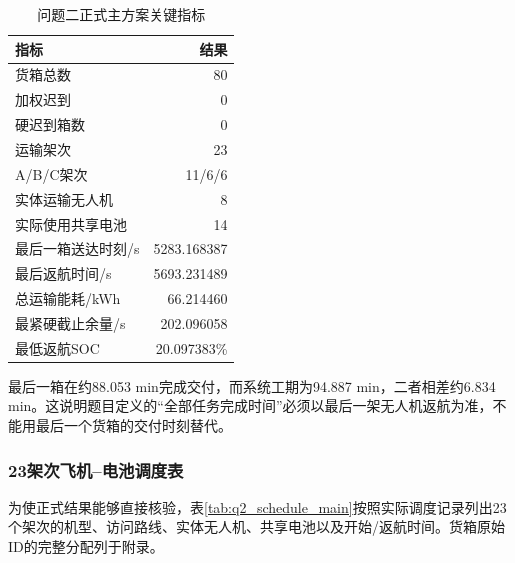 \documentclass[UTF8,a4paper,12pt]{ctexart}
\begin{document}
\begin{table}[H]
\centering
\caption{问题二正式主方案关键指标}
\label{tab:q2_main_metrics}
\begin{tabular}{lr}
\toprule
指标 & 结果\\
\midrule
货箱总数 & 80\\
加权迟到 & 0\\
硬迟到箱数 & 0\\
运输架次 & 23\\
A/B/C架次 & 11/6/6\\
实体运输无人机 & 8\\
实际使用共享电池 & 14\\
最后一箱送达时刻/s & 5283.168387\\
最后返航时间/s & 5693.231489\\
总运输能耗/kWh & 66.214460\\
最紧硬截止余量/s & 202.096058\\
最低返航SOC & 20.097383\%\\
\bottomrule
\end{tabular}
\end{table}

最后一箱在约88.053 min完成交付，而系统工期为94.887 min，二者相差约6.834 min。这说明题目定义的“全部任务完成时间”必须以最后一架无人机返航为准，不能用最后一个货箱的交付时刻替代。

\subsubsection{23架次飞机--电池调度表}

为使正式结果能够直接核验，表\ref{tab:q2_schedule_main}按照实际调度记录列出23个架次的机型、访问路线、实体无人机、共享电池以及开始/返航时间。货箱原始ID的完整分配列于附录。
\end{document}
